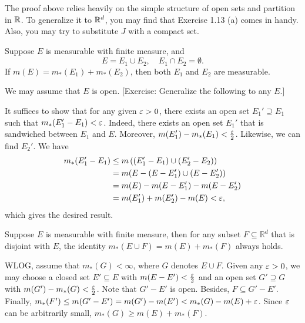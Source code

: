 \begin{remark}
  The proof above relies heavily on the simple structure of open sets and partition in $\mathbb{R}$. To generalize it to $\mathbb{R}^d$, you may find that Exercise 1.13 (a) comes in handy. Also, you may try to substitute $J$ with a compact set.
\end{remark}

\begin{Problem}[5]
  Suppose $E$ is measurable with finite measure, and
  $$
  E=E_1\cup E_2,\quad E_1\cap E_2=\emptyset.
  $$
  If $m(E)=m_*(E_1)+m_*(E_2)$, then both $E_1$ and $E_2$ are measurable.
\end{Problem}


\begin{Solution}
  We may assume that $E$ is open. [Exercise: Generalize the following to any $E$.]

  It suffices to show that for any given $\varepsilon>0$, there exists an open set $E_1'\supseteq E_1$ such that $m_*(E_1'-E_1)<\varepsilon$.
  Indeed, there exists an open set $E_1'$ that is sandwiched between $E_1$ and $E$. Moreover, $m(E_1')-m_*(E_1)<\frac{\varepsilon}2$. Likewise, we can find $E_2'$. We have
  \begin{align*}
  m_*(E_1'-E_1)&\leq m\left((E_1'-E_1)\cup(E_2'-E_2)\right)\\
  &=m(E-(E-E_1')\cup(E-E_2'))\\
  &=m(E)-m(E-E_1')-m(E-E_2')\\
  &=m(E_1')+m(E_2')-m(E)<\varepsilon,
  \end{align*}
  which gives the desired result.
\end{Solution}

\begin{Problem}[5']
	Suppose $E$ is measurable with finite measure, then for any subset $F\subseteq\mathbb{R}^d$ that is disjoint with $E$, the identity $m_*(E\cup F)=m(E)+m_*(F)$ always holds.
\end{Problem}

\begin{Solution}
  WLOG, assume that $m_*(G)<\infty$, where $G$ denotes $E\cup F$. Given any $\varepsilon>0$, we may choose a closed set $E'\subseteq E$ with $m(E-E')<\frac{\varepsilon}{2}$ and an open set $G'\supseteq G$ with $m(G')-m_*(G)<\frac{\varepsilon}{2}$.
  Note that $G'-E'$ is open. Besides, $F\subseteq G'-E'$. Finally, $m_*(F')\leq m(G'-E')=m(G')-m(E')<m_*(G)-m(E)+\varepsilon$. Since $\varepsilon$ can be arbitrarily small, $m_*(G)\geq m(E)+m_*(F)$.
\end{Solution}

